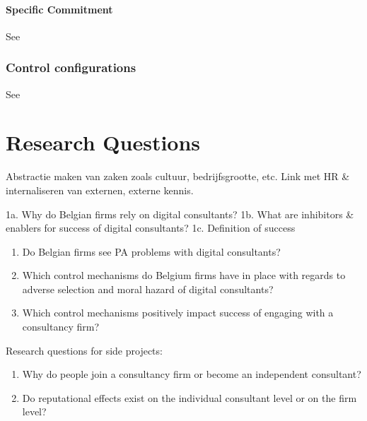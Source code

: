 \documentclass[12pt]{article}
\providecommand{\tightlist}{%
  \setlength{\itemsep}{0pt}\setlength{\parskip}{0pt}}
\begin{document}
\hypertarget{specific-commitment}{%
\paragraph{Specific Commitment}\label{specific-commitment}}

See \citet[12]{sturdy2021}

\hypertarget{control-configurations}{%
\subsubsection{Control configurations}\label{control-configurations}}

See \citet[286-289]{smith2003}

\hypertarget{research-questions}{%
\section{Research Questions}\label{research-questions}}

Abstractie maken van zaken zoals cultuur, bedrijfsgrootte, etc. Link met
HR \& internaliseren van externen, externe kennis.

1a. Why do Belgian firms rely on digital consultants? 1b. What are
inhibitors \& enablers for success of digital consultants? 1c.
Definition of success

\begin{enumerate}
\def\labelenumi{\arabic{enumi}.}
\setcounter{enumi}{1}
\tightlist
\item
  Do Belgian firms see PA problems with digital consultants?
\item
  Which control mechanisms do Belgium firms have in place with regards
  to adverse selection and moral hazard of digital consultants?
\item
  Which control mechanisms positively impact success of engaging with a
  consultancy firm?
\end{enumerate}

Research questions for side projects:

\begin{enumerate}
\def\labelenumi{\arabic{enumi}.}
\tightlist
\item
  Why do people join a consultancy firm or become an independent
  consultant?
\item
  Do reputational effects exist on the individual consultant level or on
  the firm level?
\end{enumerate}



\end{document}
